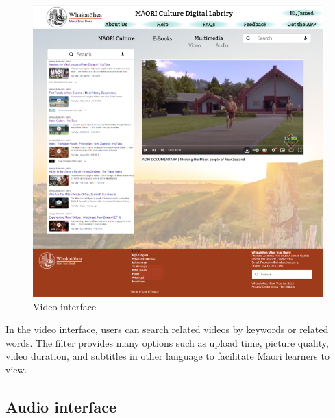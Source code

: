 \begin{figure}[htbp]
  \centerline{\includegraphics[width=400pt]{images/3-3-1.png}}
  \caption{Video interface}
  \label{fig30}
\end{figure}

In the video interface, users can search related videos by keywords or related words. The filter provides many options such as upload time, picture quality, video duration, and subtitles in other language to facilitate Māori learners to view.

\subsection{Audio interface}

